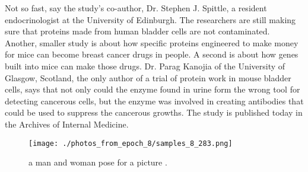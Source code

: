 \documentclass{article}%
\begin{document}
Not so fast, say the study's co{-}author, Dr. Stephen J. Spittle, a resident endocrinologist at the University of Edinburgh. The researchers are still making sure that proteins made from human bladder cells are not contaminated. Another, smaller study is about how specific proteins engineered to make money for mice can become breast cancer drugs in people. A second is about how genes built into mice can make those drugs. Dr. Parag Kanojia of the University of Glasgow, Scotland, the only author of a trial of protein work in mouse bladder cells, says that not only could the enzyme found in urine form the wrong tool for detecting cancerous cells, but the enzyme was involved in creating antibodies that could be used to suppress the cancerous growths.\newline%
The study is published today in the Archives of Internal Medicine.\newline%

%


\begin{figure}[h!]%
\centering%
\texttt{[image: ./photos\_from\_epoch\_8/samples\_8\_283.png]}%
\caption{a man and woman pose for a picture .}%
\end{figure}

%
\end{document}
